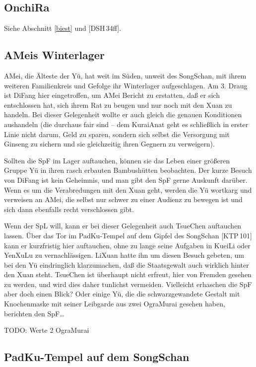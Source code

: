 \documentclass[
a4paper,
twoside,
DIV=calc,
BCOR=4mm,
fontsize=9pt,
twocolumn=on,
titlepage=on,
parskip=half
]{scrartcl}
\begin{document}
\subsection{OnchiRa}

Siehe Abschnitt \ref{biest} und [DSH\,34ff].

\subsection{AMeis Winterlager}
\label{winterlager}

AMei, die Älteste der Yü, hat weit im Süden, unweit des SongSchan, mit
ihrem weiteren Familienkreis und Gefolge ihr Winterlager
aufgeschlagen. Am 3. Draug ist DiFang hier eingetroffen, um AMei
Bericht zu erstatten, daß er sich entschlossen hat, sich ihrem Rat zu
beugen und nur noch mit den Xuan zu handeln. Bei dieser Gelegenheit
wollte er auch gleich die genauen Konditionen aushandeln (die durchaus
fair sind -- dem KuraiAnat geht es schließlich in erster Linie nicht
darum, Geld zu sparen, sondern sich selbst die Versorgung mit Ginseng
zu sichern und sie gleichzeitig ihren Gegnern zu verweigern).

Sollten die SpF im Lager auftauchen, können sie das Leben einer
größeren Gruppe Yü in ihren rasch erbauten Bambushütten
beobachten. Der kurze Besuch von DiFang ist kein Geheimnis, und man
gibt den SpF gerne Auskunft darüber. Wenn es um die Verabredungen mit
den Xuan geht, werden die Yü wortkarg und verweisen an AMei, die
selbst nur schwer zu einer Audienz zu bewegen ist und sich dann
ebenfalls recht verschlossen gibt.

Wenn der SpL will, kann er bei dieser Gelegenheit auch TsueChen
auftauchen lassen. Über das Tor im PadKu-Tempel auf dem Gipfel des
SongSchan [KTP\,101] kann er kurzfristig hier auftauchen, ohne zu
lange seine Aufgaben in KueiLi oder YenXuLu zu vernachlässigen. LiXuan
hatte ihn um diesen Besuch gebeten, um bei den Yü eindringlich
klarzumachen, daß die Staatsgewalt auch wirklich hinter den Xuan
steht. TsueChen ist überhaupt nicht erfreut, hier von Fremden gesehen
zu werden, und wird dies daher tunlichst vermeiden. Vielleicht
erhaschen die SpF aber doch einen Blick? Oder einige Yü, die die
schwarzgewandete Gestalt mit Knochenmaske mit seiner Leibgarde aus
zwei OgraMurai gesehen haben, berichten den SpF\dots

TODO: Werte 2 OgraMurai

\subsection{PadKu-Tempel auf dem SongSchan}
\end{document}
